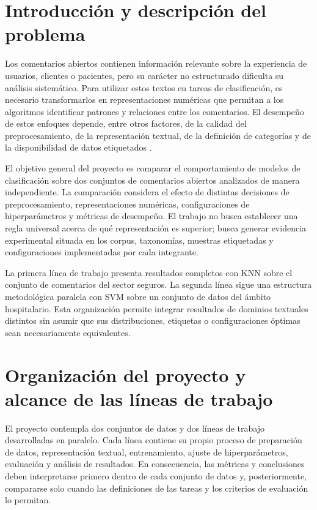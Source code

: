 \documentclass[12pt,a4paper]{article}
\begin{document}
\tableofcontents
\newpage

\section{Introducción y descripción del problema}

Los comentarios abiertos contienen información relevante sobre la experiencia de usuarios, clientes o pacientes, pero su carácter no estructurado dificulta su análisis sistemático. Para utilizar estos textos en tareas de clasificación, es necesario transformarlos en representaciones numéricas que permitan a los algoritmos identificar patrones y relaciones entre los comentarios. El desempeño de estos enfoques depende, entre otros factores, de la calidad del preprocesamiento, de la representación textual, de la definición de categorías y de la disponibilidad de datos etiquetados \cite{kowsari2019}.

El objetivo general del proyecto es comparar el comportamiento de modelos de clasificación sobre dos conjuntos de comentarios abiertos analizados de manera independiente. La comparación considera el efecto de distintas decisiones de preprocesamiento, representaciones numéricas, configuraciones de hiperparámetros y métricas de desempeño. El trabajo no busca establecer una regla universal acerca de qué representación es superior; busca generar evidencia experimental situada en los corpus, taxonomías, muestras etiquetadas y configuraciones implementadas por cada integrante.

La primera línea de trabajo presenta resultados completos con KNN sobre el conjunto de comentarios del sector seguros. La segunda línea sigue una estructura metodológica paralela con SVM sobre un conjunto de datos del ámbito hospitalario. Esta organización permite integrar resultados de dominios textuales distintos sin asumir que sus distribuciones, etiquetas o configuraciones óptimas sean necesariamente equivalentes.

\section{Organización del proyecto y alcance de las líneas de trabajo}

El proyecto contempla dos conjuntos de datos y dos líneas de trabajo desarrolladas en paralelo. Cada línea contiene su propio proceso de preparación de datos, representación textual, entrenamiento, ajuste de hiperparámetros, evaluación y análisis de resultados. En consecuencia, las métricas y conclusiones deben interpretarse primero dentro de cada conjunto de datos y, posteriormente, compararse solo cuando las definiciones de las tareas y los criterios de evaluación lo permitan.
\end{document}
